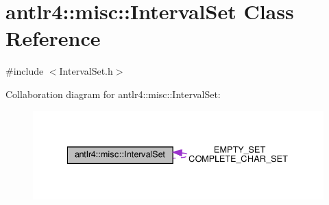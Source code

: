 \hypertarget{classantlr4_1_1misc_1_1IntervalSet}{}\section{antlr4\+:\+:misc\+:\+:Interval\+Set Class Reference}
\label{classantlr4_1_1misc_1_1IntervalSet}


{\ttfamily \#include $<$Interval\+Set.\+h$>$}



Collaboration diagram for antlr4\+:\+:misc\+:\+:Interval\+Set\+:
\nopagebreak
\begin{figure}[H]
\begin{center}
\leavevmode
\includegraphics[width=334pt]{classantlr4_1_1misc_1_1IntervalSet__coll__graph}
\end{center}
\end{figure}
